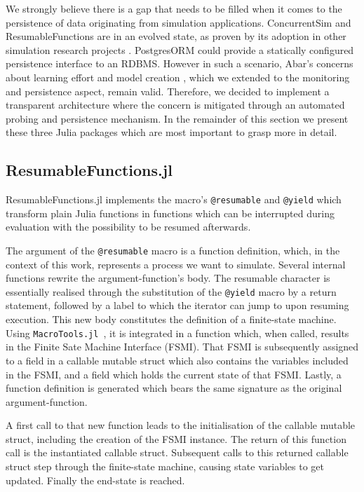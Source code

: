 \documentclass{juliacon}
\begin{document}
We strongly believe there is a gap that needs to be filled when it comes to the persistence of data originating from simulation applications. ConcurrentSim and ResumableFunctions are in an evolved state, as proven by its adoption in other simulation research projects \cite{de2018simedis,abdessameud2019manpower,hermosilla2017ballistics}. PostgresORM could provide a statically configured persistence interface to an RDBMS. However in such a scenario, Abar's concerns about learning effort and model creation \cite{abar2017agent}, which we extended to the monitoring and persistence aspect, remain valid. Therefore, we decided to implement a transparent architecture where the concern is mitigated through an automated probing and persistence mechanism. In the remainder of this section we present these three Julia packages which are most important to grasp more in detail.\vskip 6pt

\subsection{ResumableFunctions.jl}

ResumableFunctions.jl implements the macro's \texttt{@resumable} and \texttt{@yield} which transform plain Julia functions in functions which can be interrupted during evaluation with the possibility to be resumed afterwards.\vskip 6pt

The argument of the \texttt{@resumable} macro is a function definition, which, in the context of this work, represents a process we want to simulate. Several internal functions rewrite the argument-function's body. The resumable character is essentially realised through the substitution of the \texttt{@yield} macro by a return statement, followed by a label to which the iterator can jump to upon resuming execution. This new body constitutes the definition of a finite-state machine. Using \mbox{\texttt{MacroTools.jl} \cite{macrotools}}, it is integrated in a function which, when called, results in the Finite Sate Machine Interface (FSMI). That FSMI is subsequently assigned to a field in a callable mutable struct which also contains the variables included in the FSMI, and a field which holds the current state of that FSMI. Lastly, a function definition is generated which bears the same signature as the original argument-function. \vskip 6pt

A first call to that new function leads to the initialisation of the callable mutable struct, including the creation of the FSMI instance. The return of this function call is the instantiated callable struct. Subsequent calls to this returned callable struct step through the finite-state machine, causing state variables to get updated. Finally the end-state is reached. \vskip 6pt
\end{document}
